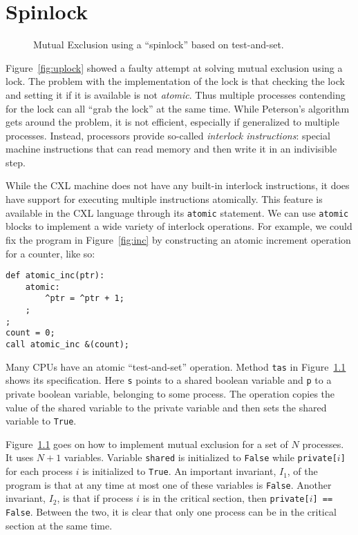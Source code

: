 \documentclass{report}
\newenvironment{code}{
\tcolorbox
}{
\endtcolorbox
}
\begin{document}
\chapter{Spinlock}

\begin{figure}
\begin{code}

\end{code}
\caption{Mutual Exclusion using a ``spinlock'' based on test-and-set.}
\label{fig:tas}
\end{figure}

Figure~\ref{fig:uplock} showed a faulty attempt at solving mutual
exclusion using a lock.  The problem with the implementation of the
lock is that checking the lock and setting it if it is available is
not \emph{atomic}.  Thus multiple processes contending for the lock
can all ``grab the lock'' at the same time.  While Peterson's
algorithm gets around the problem, it is not efficient, especially
if generalized to multiple processes.  Instead, processors provide
so-called \emph{interlock instructions}: special machine instructions
that can read memory and then write it in an indivisible step.

While the CXL machine does not have any built-in interlock instructions,
it does have support for executing multiple instructions atomically.
This feature is available in the CXL language through its \texttt{atomic}
statement.
We can use \texttt{atomic} blocks to implement a wide variety of
interlock operations.
For example, we could fix the program in Figure~\ref{fig:inc} by
constructing an atomic increment operation for a counter, like so:
\begin{code}
\begin{verbatim}
def atomic_inc(ptr):
    atomic:
        ^ptr = ^ptr + 1;
    ;
;
count = 0;
call atomic_inc &(count);
\end{verbatim}
\end{code}

Many CPUs have an atomic ``test-and-set'' operation.
Method \texttt{tas} in Figure~\ref{fig:tas} shows its specification.
Here \texttt{s} points to a shared boolean variable and \texttt{p}
to a private boolean variable, belonging to some process.
The operation copies the value of the shared variable to the
private variable and then sets the shared variable to \texttt{True}.

Figure~\ref{fig:tas} goes on how to implement mutual exclusion for
a set of $N$ processes.
It uses $N+1$ variables.
Variable \texttt{shared} is initialized to \texttt{False} while
\texttt{private[$i$]} for each process $i$ is initialized to \texttt{True}.
An important invariant, $I_1$, of the program is that at any time at most
one of these variables is \texttt{False}.
Another invariant, $I_2$, is that if process $i$ is in the critical section,
then \texttt{private[$i$] == False}.
Between the two, it is clear that only one process can be in the
critical section at the same time.
\end{document}
